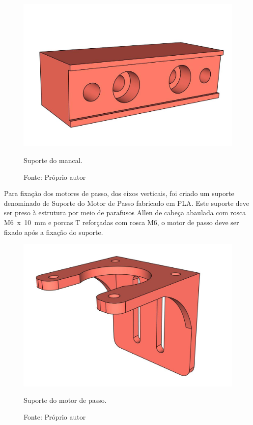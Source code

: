 \begin{figure}[H]
\centering
\includegraphics[scale = 0.4]{figuras/ressuportemancal}
\caption{Suporte do mancal.}
\caption*{Fonte: Próprio autor}
\label{fig:ressuportemancal}
\end{figure}
        
\pagebreak

Para fixação dos motores de passo, dos eixos verticais, foi criado um suporte denominado 
de Suporte do Motor de Passo fabricado em \ac{PLA}. Este suporte deve ser preso à estrutura 
por meio de parafusos Allen de cabeça abaulada com rosca M6~x~10~mm e porcas T reforçadas com rosca M6, 
o motor de passo deve ser fixado após a fixação do suporte.

\begin{figure}[H]
\centering
\includegraphics[scale = 0.4]{figuras/ressuportemotorpasso}
\caption{Suporte do motor de passo.}
\caption*{Fonte: Próprio autor}
\label{fig:ressuportemotorpasso}
\end{figure}

